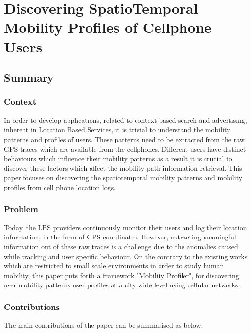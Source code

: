 \newpage
\section{Discovering SpatioTemporal Mobility Profiles of Cellphone Users \cite{DBLP:conf/wowmom/BayirDE09}} \label{lect5}

\subsection{Summary} \label{lect5-sum}

\subsubsection{Context}

In order to develop applications, related to context-based search and advertising, inherent
in Location Based Services, it is trivial to understand the mobility patterns and profiles of
users. These patterns need to be extracted from the raw GPS traces which are available from the 
cellphones. Different users have distinct behaviours which influence their mobility patterns as 
a result it is crucial to discover these factors which affect the mobility path information
retrieval. This paper focuses on discovering the spatiotemporal mobility patterns and mobility
profiles from cell phone location logs.  
   

\subsubsection{Problem}

Today, the LBS providers continuously monitor their users and log their location information, in 
the form of GPS coordinates. However, extracting meaningful information out of these raw traces is
a challenge due to the anomalies caused while tracking and user specific behaviour. On the 
contrary to the existing works which are restricted to small scale environments in order to 
study human mobility, this paper puts forth a framework "Mobility Profiler", for discovering user
mobility patterns user profiles at a city wide level using cellular networks.  

\subsubsection{Contributions}

The main contributions of the paper can be summarised as below:

